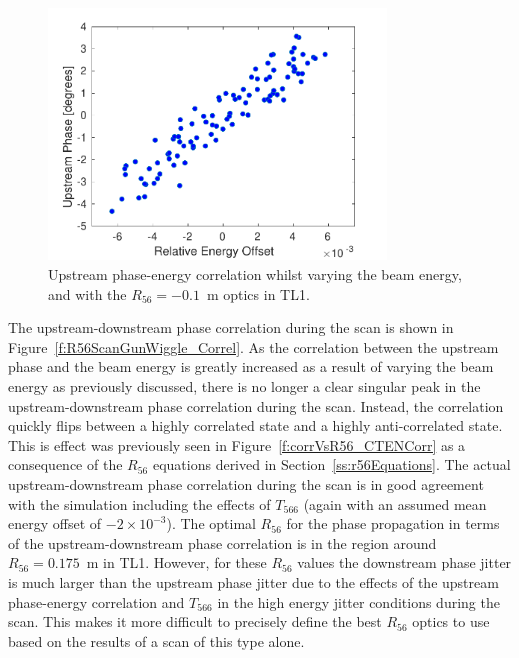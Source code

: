 \begin{figure}
  \centering
  \includegraphics[width=0.8\textwidth]{Figures/propagation/R56ScanGunWiggle_UpEnCorr}
  \caption{Upstream phase-energy correlation whilst varying the beam energy, and with the \(R_{56}=-0.1\)~m optics in TL1.}
  \label{f:R56ScanGunWiggle_UpEnCorr}
\end{figure}

The upstream-downstream phase correlation during the scan is shown in Figure~\ref{f:R56ScanGunWiggle_Correl}. As the correlation between the upstream phase and the beam energy is greatly increased as a result of varying the beam energy as previously discussed, there is no longer a clear singular peak in the upstream-downstream phase correlation during the scan. Instead, the correlation quickly flips between a highly correlated state and a highly anti-correlated state. This is effect was previously seen in Figure~\ref{f:corrVsR56_CTENCorr} as a consequence of the \(R_{56}\) equations derived in Section~\ref{ss:r56Equations}. The actual upstream-downstream phase correlation during the scan is in good agreement with the simulation including the effects of \(T_{566}\) (again with an assumed mean energy offset of \(-2\times10^{-3}\)). The optimal \(R_{56}\) for the phase propagation in terms of the upstream-downstream phase correlation is in the region around \(R_{56}=0.175\)~m in TL1. However, for these \(R_{56}\) values the downstream phase jitter is much larger than the upstream phase jitter due to the effects of the upstream phase-energy correlation and \(T_{566}\) in the high energy jitter conditions during the scan. This makes it more difficult to precisely define the best \(R_{56}\) optics to use based on the results of a scan of this type alone.




